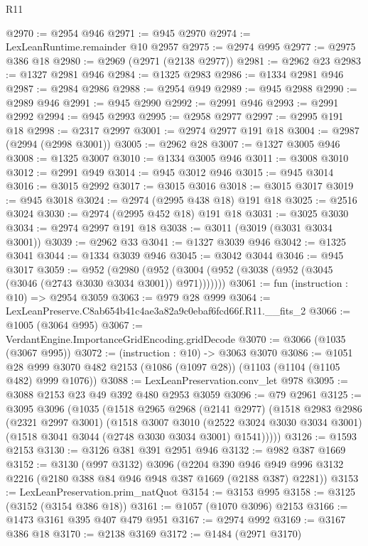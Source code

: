 \begin{lexlean}{R11}
\begin{coremodule}
@2970 := @2954 @946
@2971 := @945 @2970
@2974 := LexLeanRuntime.remainder @10 @2957
@2975 := @2974 @995
@2977 := @2975 @386 @18
@2980 := @2969 (@2971 (@2138 @2977))
@2981 := @2962 @23
@2983 := @1327 @2981 @946
@2984 := @1325 @2983
@2986 := @1334 @2981 @946
@2987 := @2984 @2986
@2988 := @2954 @949
@2989 := @945 @2988
@2990 := @2989 @946
@2991 := @945 @2990
@2992 := @2991 @946
@2993 := @2991 @2992
@2994 := @945 @2993
@2995 := @2958 @2977
@2997 := @2995 @191 @18
@2998 := @2317 @2997
@3001 := @2974 @2977 @191 @18
@3004 := @2987 (@2994 (@2998 @3001))
@3005 := @2962 @28
@3007 := @1327 @3005 @946
@3008 := @1325 @3007
@3010 := @1334 @3005 @946
@3011 := @3008 @3010
@3012 := @2991 @949
@3014 := @945 @3012 @946
@3015 := @945 @3014
@3016 := @3015 @2992
@3017 := @3015 @3016
@3018 := @3015 @3017
@3019 := @945 @3018
@3024 := @2974 (@2995 @438 @18) @191 @18
@3025 := @2516 @3024
@3030 := @2974 (@2995 @452 @18) @191 @18
@3031 := @3025 @3030
@3034 := @2974 @2997 @191 @18
@3038 := @3011 (@3019 (@3031 @3034 @3001))
@3039 := @2962 @33
@3041 := @1327 @3039 @946
@3042 := @1325 @3041
@3044 := @1334 @3039 @946
@3045 := @3042 @3044
@3046 := @945 @3017
@3059 := @952
    (@2980 (@952 (@3004 (@952 (@3038 (@952 (@3045 (@3046 (@2743 @3030 @3034 @3001)) @971)))))))
@3061 := fun (instruction : @10) => @2954 @3059
@3063 := @979 @28 @999
@3064 := LexLeanPreserve.C8ab654b41c4ae3a82a9c0ebaf6fcd66f.R11.__fits_2
@3066 := @1005 (@3064 @995)
@3067 := VerdantEngine.ImportanceGridEncoding.gridDecode
@3070 := @3066 (@1035 (@3067 @995))
@3072 := (instruction : @10) -> @3063 @3070
@3086 := @1051 @28 @999 @3070 @482 @2153 (@1086 (@1097 @28)) (@1103 (@1104 (@1105 @482) @999 @1076))
@3088 := LexLeanPreservation.conv_let @978
@3095 := @3088 @2153 @23 @49 @392 @480 @2953 @3059
@3096 := @79 @2961
@3125 := @3095
    @3096
    (@1035
      (@1518
        @2965
        @2968
        (@2141 @2977)
        (@1518
          @2983
          @2986
          (@2321 @2997 @3001)
          (@1518
            @3007
            @3010
            (@2522 @3024 @3030 @3034 @3001)
            (@1518 @3041 @3044 (@2748 @3030 @3034 @3001) @1541)))))
@3126 := @1593 @2153
@3130 := @3126 @381 @391 @2951 @946
@3132 := @982 @387 @1669
@3152 := @3130
    (@997 @3132)
    @3096
    (@2204 @390 @946 @949 @996 @3132 @2216 (@2180 @388 @84 @946 @948 @387 @1669 (@2188 @387) @2281))
@3153 := LexLeanPreservation.prim_natQuot
@3154 := @3153 @995
@3158 := @3125 (@3152 (@3154 @386 @18))
@3161 := @1057 (@1070 @3096) @2153
@3166 := @1473 @3161 @395 @407 @479 @951
@3167 := @2974 @992
@3169 := @3167 @386 @18
@3170 := @2138 @3169
@3172 := @1484 (@2971 @3170)

\end{coremodule}
\end{lexlean}
